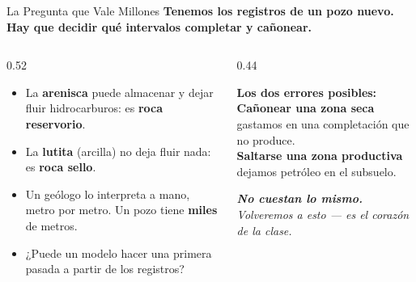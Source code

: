 \documentclass[aspectratio=169, 11pt]{beamer}
\begin{document}
\begin{frame}[shrink=12]{La Pregunta que Vale Millones}
  \vspace{-6pt}
  {\small\color{arcaDark}\bfseries
    Tenemos los registros de un pozo nuevo. Hay que decidir \textbf{qué intervalos completar y cañonear}.}

  \vspace{6pt}
  \begin{columns}[T]
    \begin{column}{0.52\textwidth}
      {\footnotesize\color{textMuted}
      \begin{itemize}\setlength{\itemsep}{6pt}
        \item[{\color{arcaRed}\scriptsize\faLayerGroup}]
          La \textbf{arenisca} puede almacenar y dejar fluir hidrocarburos:
          es \textbf{roca reservorio}.
        \item[{\color{arcaRed}\scriptsize\faBan}]
          La \textbf{lutita} (arcilla) no deja fluir nada:
          es \textbf{roca sello}.
        \item[{\color{arcaRed}\scriptsize\faQuestion}]
          Un geólogo lo interpreta a mano, metro por metro.
          Un pozo tiene \textbf{miles} de metros.
        \item[{\color{codeGreen}\scriptsize\faRobot}]
          ¿Puede un modelo hacer una primera pasada
          a partir de los registros?
      \end{itemize}
      }
    \end{column}
    \begin{column}{0.44\textwidth}
      \begin{tcolorbox}[colback=arcaGray, colframe=arcaRed, boxrule=0pt, leftrule=3pt,
        arc=3pt, left=6pt, right=6pt, top=5pt, bottom=5pt]
        {\scriptsize\color{arcaDark}\bfseries Los dos errores posibles:}\\[5pt]
        {\scriptsize\color{textMuted}
          \textbf{\color{arcaRed}Cañonear una zona seca}\\
          gastamos en una completación que no produce.\\[6pt]
          \textbf{\color{arcaRed}Saltarse una zona productiva}\\
          dejamos petróleo en el subsuelo.}
      \end{tcolorbox}
      \vspace{5pt}
      {\scriptsize\color{arcaDark}\itshape
        \textbf{No cuestan lo mismo.} Volveremos a esto ---
        es el corazón de la clase.}
    \end{column}
  \end{columns}
\end{frame}
\end{document}

